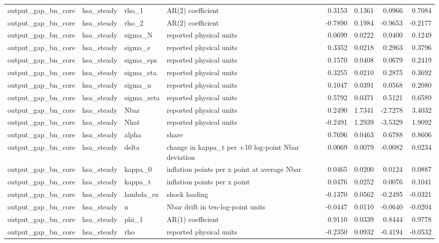 \begin{tabular}{llllrrrr}
output\_gap\_bn\_core & hsa\_steady & rho\_1 & AR(2) coefficient & 0.3153 & 0.1361 & 0.0966 & 0.7084 \\
output\_gap\_bn\_core & hsa\_steady & rho\_2 & AR(2) coefficient & -0.7890 & 0.1984 & -0.9653 & -0.2177 \\
output\_gap\_bn\_core & hsa\_steady & sigma\_N & reported physical units & 0.0699 & 0.0222 & 0.0400 & 0.1249 \\
output\_gap\_bn\_core & hsa\_steady & sigma\_e & reported physical units & 0.3352 & 0.0218 & 0.2963 & 0.3796 \\
output\_gap\_bn\_core & hsa\_steady & sigma\_eps & reported physical units & 0.1570 & 0.0408 & 0.0679 & 0.2419 \\
output\_gap\_bn\_core & hsa\_steady & sigma\_eta & reported physical units & 0.3255 & 0.0210 & 0.2875 & 0.3692 \\
output\_gap\_bn\_core & hsa\_steady & sigma\_u & reported physical units & 0.1047 & 0.0391 & 0.0568 & 0.2080 \\
output\_gap\_bn\_core & hsa\_steady & sigma\_zeta & reported physical units & 0.5792 & 0.0371 & 0.5121 & 0.6589 \\
output\_gap\_bn\_core & hsa\_steady & Nbar & reported physical units & 0.2490 & 1.7341 & -2.7278 & 3.4032 \\
output\_gap\_bn\_core & hsa\_steady & Nhat & reported physical units & -0.2491 & 1.2939 & -3.5329 & 1.9092 \\
output\_gap\_bn\_core & hsa\_steady & alpha & share & 0.7696 & 0.0463 & 0.6788 & 0.8606 \\
output\_gap\_bn\_core & hsa\_steady & delta & change in kappa\_t per +10 log-point Nbar deviation & 0.0069 & 0.0079 & -0.0082 & 0.0234 \\
output\_gap\_bn\_core & hsa\_steady & kappa\_0 & inflation points per x point at average Nbar & 0.0465 & 0.0200 & 0.0124 & 0.0887 \\
output\_gap\_bn\_core & hsa\_steady & kappa\_t & inflation points per x point & 0.0476 & 0.0252 & 0.0076 & 0.1041 \\
output\_gap\_bn\_core & hsa\_steady & lambda\_ez & shock loading & -0.1370 & 0.0562 & -0.2495 & -0.0321 \\
output\_gap\_bn\_core & hsa\_steady & n & Nbar drift in ten-log-point units & -0.0447 & 0.0110 & -0.0640 & -0.0204 \\
output\_gap\_bn\_core & hsa\_steady & phi\_1 & AR(1) coefficient & 0.9110 & 0.0339 & 0.8444 & 0.9778 \\
output\_gap\_bn\_core & hsa\_steady & rho & reported physical units & -0.2350 & 0.0932 & -0.4194 & -0.0532 \\

\end{tabular}
